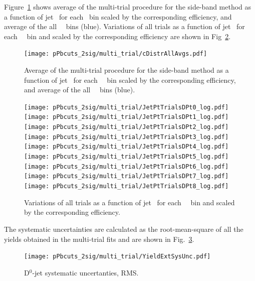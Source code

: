 Figure~\ref{fig:MultiTrialSB_trials_pPB_Dzero} shows average of the multi-trial procedure for the side-band method as a function of jet \pt\ for each \Dzero \pt\ bin scaled by the corresponding efficiency, and average of the all \Dzero\ \pt\ bins (blue). 
Variations of all trials as a function of jet \pt\ for each \Dzero\ \pt\ bin and scaled by the corresponding efficiency are shown in Fig~\ref{fig:MultiTrialSB_allDptVairations_pPB_Dzero}.

\begin{figure}[bth]
\begin{center}
\texttt{[image: pPbcuts\_2sig/multi\_trial/cDistrAllAvgs.pdf]}
\caption{Average of the multi-trial procedure for the side-band method as a function of jet \pt\ for each \Dzero\ \pt\ bin scaled by the corresponding efficiency, and average of the all \Dzero\ \pt\ bins (blue).} 
\label{fig:MultiTrialSB_trials_pPB_Dzero}
\end{center}
\end{figure}

\begin{figure}[bth]
\begin{center}
\texttt{[image: pPbcuts\_2sig/multi\_trial/JetPtTrialsDPt0\_log.pdf]}
\texttt{[image: pPbcuts\_2sig/multi\_trial/JetPtTrialsDPt1\_log.pdf]}
\texttt{[image: pPbcuts\_2sig/multi\_trial/JetPtTrialsDPt2\_log.pdf]}
\texttt{[image: pPbcuts\_2sig/multi\_trial/JetPtTrialsDPt3\_log.pdf]}
\texttt{[image: pPbcuts\_2sig/multi\_trial/JetPtTrialsDPt4\_log.pdf]}
\texttt{[image: pPbcuts\_2sig/multi\_trial/JetPtTrialsDPt5\_log.pdf]}
\texttt{[image: pPbcuts\_2sig/multi\_trial/JetPtTrialsDPt6\_log.pdf]}
\texttt{[image: pPbcuts\_2sig/multi\_trial/JetPtTrialsDPt7\_log.pdf]}
\texttt{[image: pPbcuts\_2sig/multi\_trial/JetPtTrialsDPt8\_log.pdf]}
\caption{Variations of all trials as a function of jet \pt\ for each \Dzero\ \pt\ bin and scaled by the corresponding efficiency.} 
\label{fig:MultiTrialSB_allDptVairations_pPB_Dzero}
\end{center}
\end{figure}

The systematic uncertainties are calculated as the root-mean-square of all the yields obtained in the multi-trial fits and are shown in Fig.~\ref{fig:MultiTrialRMS_pPB_Dzero}.
\begin{figure}[bth]
\begin{center}
\texttt{[image: pPbcuts\_2sig/multi\_trial/YieldExtSysUnc.pdf]} 
\caption{D$^0$-jet systematic uncertanties, RMS.}
\label{fig:MultiTrialRMS_pPB_Dzero}
\end{center}
\end{figure}


